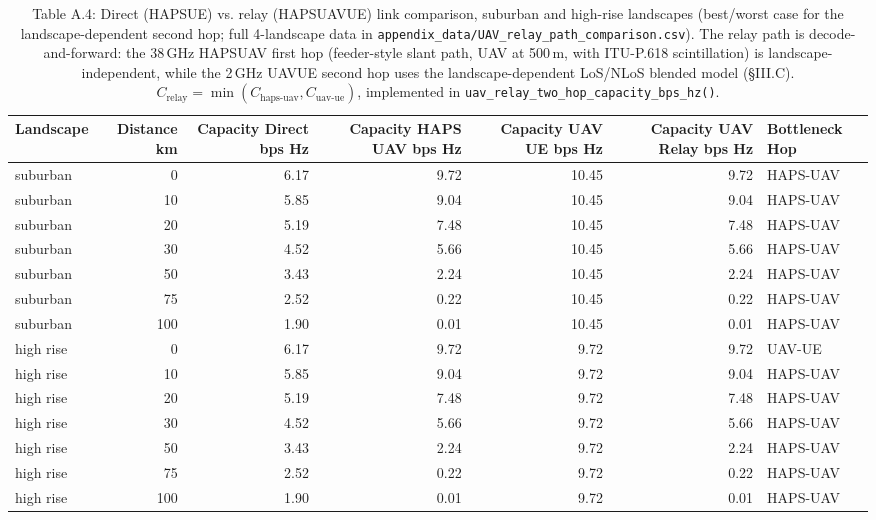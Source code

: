 \begin{table}[htbp]
\centering
\small
\begin{tabular}{lrrrrrl}
\toprule
Landscape & Distance km & Capacity Direct bps Hz & Capacity HAPS UAV bps Hz & Capacity UAV UE bps Hz & Capacity UAV Relay bps Hz & Bottleneck Hop \\
\midrule
suburban & 0 & 6.17 & 9.72 & 10.45 & 9.72 & HAPS-UAV \\
suburban & 10 & 5.85 & 9.04 & 10.45 & 9.04 & HAPS-UAV \\
suburban & 20 & 5.19 & 7.48 & 10.45 & 7.48 & HAPS-UAV \\
suburban & 30 & 4.52 & 5.66 & 10.45 & 5.66 & HAPS-UAV \\
suburban & 50 & 3.43 & 2.24 & 10.45 & 2.24 & HAPS-UAV \\
suburban & 75 & 2.52 & 0.22 & 10.45 & 0.22 & HAPS-UAV \\
suburban & 100 & 1.90 & 0.01 & 10.45 & 0.01 & HAPS-UAV \\
high rise & 0 & 6.17 & 9.72 & 9.72 & 9.72 & UAV-UE \\
high rise & 10 & 5.85 & 9.04 & 9.72 & 9.04 & HAPS-UAV \\
high rise & 20 & 5.19 & 7.48 & 9.72 & 7.48 & HAPS-UAV \\
high rise & 30 & 4.52 & 5.66 & 9.72 & 5.66 & HAPS-UAV \\
high rise & 50 & 3.43 & 2.24 & 9.72 & 2.24 & HAPS-UAV \\
high rise & 75 & 2.52 & 0.22 & 9.72 & 0.22 & HAPS-UAV \\
high rise & 100 & 1.90 & 0.01 & 9.72 & 0.01 & HAPS-UAV \\
\bottomrule
\end{tabular}

\caption{Table A.4: Direct (HAPS\textrightarrow UE) vs. relay (HAPS\textrightarrow UAV\textrightarrow UE) link comparison, suburban and high-rise landscapes (best/worst case for the landscape-dependent second hop; full 4-landscape data in \texttt{appendix\_data/UAV\_relay\_path\_comparison.csv}). The relay path is decode-and-forward: the 38\,GHz HAPS\textrightarrow UAV first hop (feeder-style slant path, UAV at 500\,m, with ITU-P.618 scintillation) is landscape-independent, while the 2\,GHz UAV\textrightarrow UE second hop uses the landscape-dependent LoS/NLoS blended model (\S III.C). $C_{\text{relay}} = \min(C_{\text{haps-uav}}, C_{\text{uav-ue}})$, implemented in \texttt{uav\_relay\_two\_hop\_capacity\_bps\_hz()}.}
\label{table:app-uav-relay-comparison}
\end{table}
